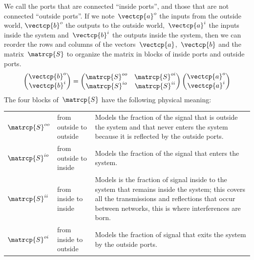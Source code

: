 \begin{refsection}
We call the ports that are connected ``inside ports'', and those that are not connected ``outside ports''.
If we note~$\vectcp{a}^o$ the inputs from the outside world,
$\vectcp{b}^o$ the outputs to the outside world,~$\vectcp{a}^i$ the inputs inside the system and~$\vectcp{b}^i$ the outputs inside the system, then we can reorder the rows and columns of the vectors~$\vectcp{a}$,~$\vectcp{b}$ and the matrix~$\matrcp{S}$ to organize the matrix in blocks of inside ports and outside ports.
\begin{equation}
    \begin{pmatrix}
        \vectcp{b}^o\\
        \vectcp{b}^i
    \end{pmatrix}
    =
    \begin{pmatrix}
        \matrcp{S}^{oo} & \matrcp{S}^{oi} \\
        \matrcp{S}^{io} & \matrcp{S}^{ii} \\
    \end{pmatrix}
    \begin{pmatrix}
        \vectcp{a}^o\\
        \vectcp{a}^i
    \end{pmatrix}
    \label{eq:s_outside_inside}
\end{equation}
The four blocks of~$\matrcp{S}$ have the following physical meaning:
\begin{table}[H]
    \centering
    \begin{tabularx}{\textwidth}{l l X}
        $\matrcp{S}^{oo}$ & from outside to outside &
        Models the fraction of the signal that is outside the system and that never enters the system because it is reflected by the outside ports.
        \\
        $\matrcp{S}^{io}$ & from outside to inside &
        Models the fraction of the signal that enters the system.
        \\
        $\matrcp{S}^{ii}$ & from inside to inside &
        Models is the fraction of signal inside to the system that remains inside the system; this covers all the transmissions and reflections that occur between networks, this is where interferences are born.
        \\
        $\matrcp{S}^{oi}$ & from inside to outside &
        Models the fraction of signal that exits the system by the outside ports.
        \\
    \end{tabularx}
\end{table}


\end{refsection}
